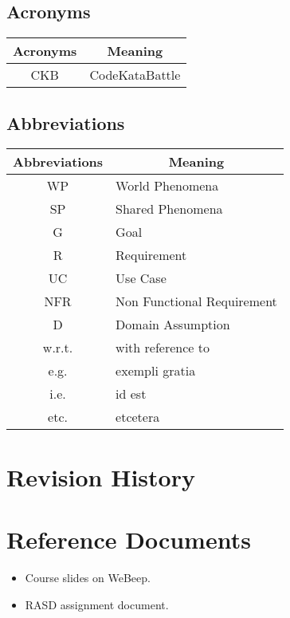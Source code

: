 \subsection{Acronyms}

\begin{table}[H]
    \centering
    \begin{tabular}{|c|l|}
    \hline
    \rowcolor[HTML]{B8C8D5} 
    \textbf{Acronyms} & \multicolumn{1}{c|}{\cellcolor[HTML]{B8C8D5}\textbf{Meaning}} \\ \hline
    CKB & CodeKataBattle  \\ \hline
    \end{tabular}
\end{table}

\subsection{Abbreviations}

\begin{table}[H]
    \centering
    \begin{tabular}{|c|l|}
    \hline
    \rowcolor[HTML]{B8C8D5} 
    \textbf{Abbreviations} & \multicolumn{1}{c|}{\cellcolor[HTML]{B8C8D5}\textbf{Meaning}} \\ \hline
    WP & World Phenomena  \\ \hline
    SP & Shared Phenomena \\ \hline
    G  & Goal             \\ \hline
    R  & Requirement             \\ \hline
    UC  & Use Case             \\ \hline
    NFR  & Non Functional Requirement             \\ \hline
    D  & Domain Assumption             \\ \hline
    w.r.t. & with reference to \\ \hline
    e.g. & exempli gratia \\ \hline
    i.e. & id est \\ \hline
    etc. & etcetera \\ \hline
    \end{tabular}
\end{table}

\section{Revision History}

\section{Reference Documents}
\begin{itemize}
    \item Course slides on WeBeep. 
    \item RASD assignment document.
\end{itemize}


